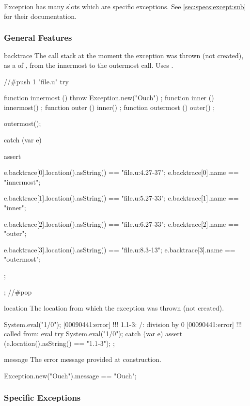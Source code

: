 Exception has many slots which are specific exceptions.  See
\autoref{sec:specs:except:sub} for their documentation.

\subsubsection{General Features}
\begin{urbiscriptapi}
\item[backtrace] The call stack at the moment the exception was thrown (not
  created), as a  of , from the
  innermost to the outermost call.  Uses .
\begin{urbiscript}
//#push 1 "file.u"
try
{
  function innermost () { throw Exception.new("Ouch") };
  function inner     () { innermost() };
  function outer     () { inner() };
  function outermost () { outer() };

  outermost();
}
catch (var e)
{
  assert
  {
    e.backtrace[0].location().asString() == "file.u:4.27-37";
    e.backtrace[0].name == "innermost";

    e.backtrace[1].location().asString() == "file.u:5.27-33";
    e.backtrace[1].name == "inner";

    e.backtrace[2].location().asString() == "file.u:6.27-33";
    e.backtrace[2].name == "outer";

    e.backtrace[3].location().asString() == "file.u:8.3-13";
    e.backtrace[3].name == "outermost";
  };
};
//#pop
\end{urbiscript}


\item[location] The location from which the exception was thrown (not
  created).
\begin{urbiscript}
System.eval("1/0");
[00090441:error] !!! 1.1-3: /: division by 0
[00090441:error] !!!    called from: eval
try
{
  System.eval("1/0");
}
catch (var e)
{
  assert (e.location().asString() == "1.1-3");
};
\end{urbiscript}


\item[message] The error message provided at construction.
\begin{urbiassert}
Exception.new("Ouch").message == "Ouch";
\end{urbiassert}
\end{urbiscriptapi}

\subsubsection{Specific Exceptions}
\label{sec:specs:except:sub}

